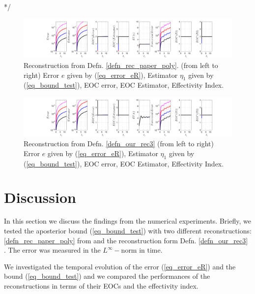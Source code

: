 \documentclass[12pt,a4paper]{article}
\numberwithin{equation}{section}
\theoremstyle{definition}
\begin{document}
*/
\begin{figure}[H]
	\hspace{-3cm}
	\includegraphics[scale=0.55]{fig_LeapFrogplots_1x5_sin_IC_harmonic_u10_v0_paperrec_poly_our_res}	
	\caption{Reconstruction from Defn. \ref{defn_rec_paper_poly}. (from left to right) Error $e$ given by (\ref{eq_error_eR}), Estimator $\eta_1$ given by (\ref{eq_bound_test}), EOC error, EOC Estimator, Effectivity Index.}
	\label{fig_all_in_one_paperrec_poly_u10_v1}
\end{figure}

\begin{figure}[H]
	\hspace{-3cm}
	\includegraphics[scale=0.55]{fig_LeapFrogplots_1x5_sin_IC_harmonic_u10_v0_paperrec_poly_tristan}	
\caption{Reconstruction from Defn. \ref{defn_our_rec3} (from left to right) Error $e$ given by (\ref{eq_error_eR}), Estimator $\eta_1$ given by (\ref{eq_bound_test}), EOC error, EOC Estimator, Effectivity Index.}
	\label{fig_all_in_one_paperrec_poly_tristan_u10_v0}
\end{figure}



\section{Discussion}\label{sec:discussion}
In this section we discuss the findings from the numerical experiments.  Briefly, we tested the aposterior bound (\ref{eq_bound_test}) with two different reconstructions: \ref{defn_rec_paper_poly} from \cite{georgoulis2016posteriori} and the reconstruction form Defn. \ref{defn_our_rec3} . The error was measured in the $L^{\infty}-$norm in time. 

 We investigated the temporal evolution of the error (\ref{eq_error_eR})  and the bound (\ref{eq_bound_test}) and we compared the performances of the  reconstructions in terms of their EOCs and the effectivity index.
\end{document}
